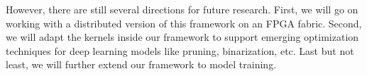 \documentclass{acm_proc_article-sp-copy}
\begin{document}
However, there are still several directions for future research. First, we will go on working with a distributed version of this framework on an FPGA fabric. Second, we will adapt the kernels inside our framework to support emerging optimization techniques for deep learning models like pruning, binarization, etc. Last but not least, we will further extend our framework to model training.



%

%
%

\end{document}
